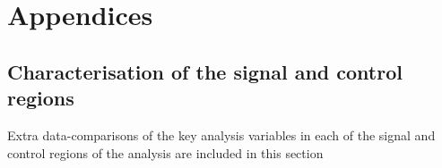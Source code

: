 \chapter{Appendices}
\label{app:appendices}

\section{Characterisation of the signal and control regions}
\label{app:charac}

Extra data-\MC comparisons of the key analysis variables in each of
the signal and control regions of the analysis are included in this
section


